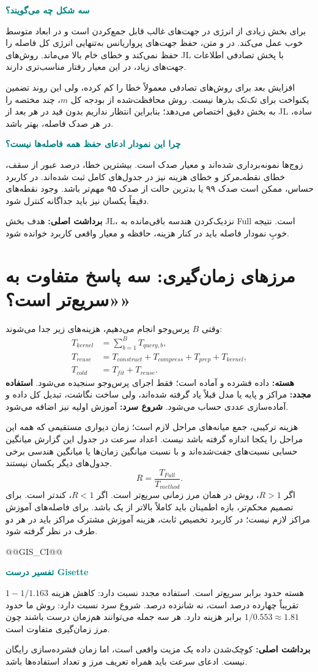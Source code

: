 \documentclass[11pt,a4paper]{article}
\newcommand{\lesson}[1]{\clearpage\section{#1}}
\newcommand{\key}[1]{\par\vspace{4pt}\noindent\colorbox{pale}{\parbox{\dimexpr\textwidth-2\fboxsep\relax}{\textbf{برداشت اصلی:} #1}}\par\vspace{3pt}}
\newcommand{\sub}[1]{\par\vspace{3pt}\textbf{\textcolor{teal}{#1}}\par}
\begin{document}
\sub{سه شکل چه می‌گویند؟}
برای  بخش زیادی از انرژی در جهت‌های غالب قابل جمع‌کردن است و  در ابعاد متوسط خوب عمل می‌کند. در  و متن، حفظ جهت‌های پر‌واریانس به‌تنهایی انرژی کل فاصله را حفظ نمی‌کند و خطای  خام بالا می‌ماند. روش‌های JL با پخش تصادفی اطلاعات جهت‌های زیاد، در این معیار رفتار مناسب‌تری دارند.

افزایش بعد برای روش‌های تصادفی معمولاً خطا را کم کرده، ولی این روند تضمین یکنواخت برای تک‌تک بذرها نیست. روش محافظت‌شده از بودجه کل \(m\)، چند مختصه را به بخش دقیق اختصاص می‌دهد؛ بنابراین انتظار نداریم بدون قید در هر بعد از JL ساده، در هر صدک فاصله، بهتر باشد.

\sub{چرا این نمودار ادعای حفظ همه فاصله‌ها نیست؟}
زوج‌ها نمونه‌برداری شده‌اند و معیار صدک است. بیشترین خطا، درصد عبور از سقف، خطای نقطه‌ـ‌مرکز و خطای هزینه نیز در جدول‌های کامل ثبت شده‌اند. در کاربرد حساس، ممکن است صدک ۹۹ یا بدترین حالت از صدک ۹۵ مهم‌تر باشد. وجود نقطه‌های دقیقاً یکسان نیز باید جداگانه کنترل شود.
\key{هدف بخش JL، نزدیک‌کردن هندسه باقی‌مانده به Full است. نتیجه خوبِ نمودار فاصله باید در کنار هزینه، حافظه و معیار واقعی کاربرد خوانده شود.}

\lesson{مرزهای زمان‌گیری: سه پاسخ متفاوت به «سریع‌تر است؟»}
وقتی \(B\) پرس‌وجو انجام می‌دهیم، هزینه‌های زیر جدا می‌شوند:
\begin{align*}
 T_{kernel}&=\sum_{b=1}^{B}T_{query,b},\\
 T_{reuse}&=T_{construct}+T_{compress}+T_{prep}+T_{kernel},\\
 T_{cold}&=T_{fit}+T_{reuse}.
\end{align*}
\textbf{هسته:} داده فشرده و آماده است؛ فقط اجرای پرس‌وجو سنجیده می‌شود. \textbf{استفاده مجدد:} مراکز و پایه یا مدل  قبلاً یاد گرفته شده‌اند، ولی ساخت نگاشت، تبدیل کل داده و آماده‌سازی عددی حساب می‌شود. \textbf{شروع سرد:} آموزش اولیه نیز اضافه می‌شود.

هزینه ترکیبی، جمع میانه‌های مراحل لازم است؛ زمان دیواری مستقیمی که همه این مراحل را یکجا اندازه گرفته باشد نیست. اعداد سرعت در جدول این گزارش میانگین حسابی نسبت‌های جفت‌شده‌اند و با نسبت میانگین زمان‌ها یا میانگین هندسی برخی جدول‌های دیگر یکسان نیستند.
\[
 R=\frac{T_{Full}}{T_{method}}.
\]
اگر \(R>1\)، روش در همان مرز زمانی سریع‌تر است. اگر \(R<1\)، کندتر است. برای تصمیم محکم‌تر، بازه اطمینان باید کاملاً بالاتر از یک باشد. برای فاصله‌های  آموزش مراکز لازم نیست؛ در کاربرد تخصیص ثابت، هزینه آموزش مشترک مراکز باید در هر دو طرف در نظر گرفته شود.

@@GIS_CI@@
\sub{تفسیر درست Gisette}
هسته حدود  برابر سریع‌تر است. استفاده مجدد نسبت  دارد: کاهش هزینه \(1-1/1.163\) تقریباً چهارده درصد است، نه شانزده درصد. شروع سرد نسبت  دارد: روش ما حدود \(1/0.553\approx1.81\) برابر هزینه  دارد. هر سه جمله می‌توانند هم‌زمان درست باشند چون مرز زمان‌گیری متفاوت است.
\key{کوچک‌شدن داده یک مزیت واقعی است، اما زمان فشرده‌سازی رایگان نیست. ادعای سرعت باید همراه تعریف مرز و تعداد استفاده‌ها باشد.}
\end{document}
